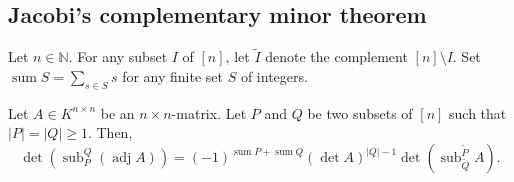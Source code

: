 \subsection{Jacobi's complementary minor theorem}

\begin{theorem}
\label{thm.det.jacobi-complement}
\leantarget
\leanok
Let $n \in \mathbb{N}$. For any subset $I$ of $[n]$, let $\widetilde{I}$
denote the complement $[n] \setminus I$. Set
$\operatorname{sum} S = \sum_{s \in S} s$ for any finite set $S$ of integers.

Let $A \in K^{n \times n}$ be an $n \times n$-matrix. Let $P$ and $Q$ be two
subsets of $[n]$ such that $|P| = |Q| \geq 1$. Then,
\[
  \det\left( \operatorname{sub}_P^Q (\operatorname{adj} A) \right)
  = (-1)^{\operatorname{sum} P + \operatorname{sum} Q}
    (\det A)^{|Q| - 1}
    \det\left( \operatorname{sub}_{\widetilde{Q}}^{\widetilde{P}} A \right).
\]
\end{theorem}

